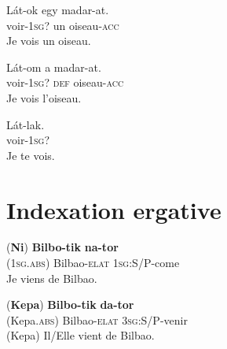 \documentclass[oldfontcommands,twoside,a4paper,12pt]{article}
\newcommand{\ipa}[1]{{\phon\textbf{#1}}}
\begin{document}
  \begin{exe}
\ex 
\gll  Lát-ok egy madar-at.\\
voir-\textsc{1sg?} un oiseau-\textsc{acc} \\
\glt Je vois un oiseau.
\end{exe} 
 
 \begin{exe}
\ex 
\gll  Lát-om a madar-at.\\
voir-\textsc{1sg?} \textsc{def} oiseau-\textsc{acc} \\
\glt Je vois l'oiseau.
\end{exe}
 
  \begin{exe}
\ex 
\gll  Lát-lak.\\
voir-\textsc{1sg?}   \\
\glt Je te vois.
\end{exe}

 
 
 \section{Indexation ergative}
%



\begin{exe}
\ex 
\label{ex:1a}
\gll (\ipa{Ni}) \ipa{Bilbo-tik} \ipa{na-tor}\\
(\textsc{1sg.abs}) {Bilbao-\textsc{elat}} {\textsc{1sg}:S/P-come}\\ %
\trans Je viens de Bilbao.
\end{exe}

\begin{exe}
\ex 
\label{ex:1a}
\gll (\ipa{Kepa}) \ipa{Bilbo-tik} \ipa{da-tor}\\
(Kepa.\textsc{abs}) {Bilbao-\textsc{elat}} {\textsc{3sg}:S/P-venir}\\ %
\trans (Kepa) Il/Elle vient de Bilbao.
\end{exe}
\end{document}
